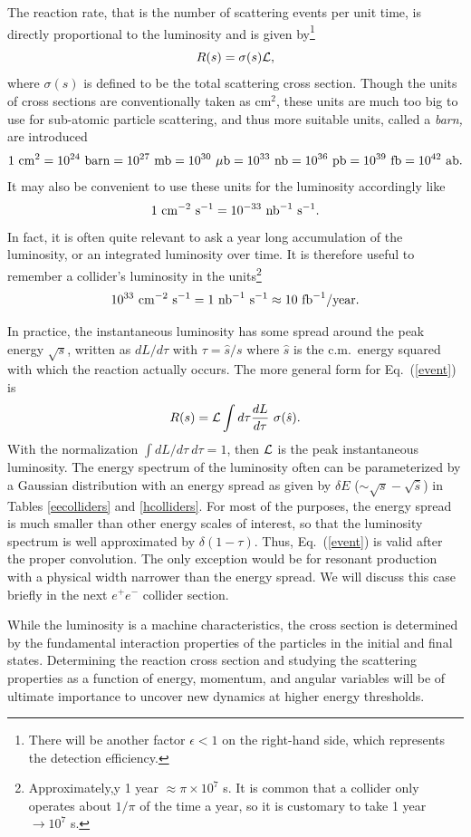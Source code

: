 \documentclass[12pt,prd,aps,floats,preprintnumbers,preprint,superscriptaddress,floatfix,nofootinbib]{revtex4}
\def\epem{e^+e^-}
\def\nbi{{\rm nb}^{-1}}
\def\fbi{{\rm fb}^{-1}}
\def\be{\begin{equation}}
\def\ee{\end{equation}}
\begin{document}
The reaction rate, that is the number of scattering events per unit time,
is  directly proportional to the luminosity and is  given by\footnote{There 
will be another factor $\epsilon<1$ on the right-hand side, 
which represents the detection efficiency.}
\be
\label{event}
R(s) = \sigma(s) \cal{L},
\ee
where $\sigma(s)$ is defined to be the total scattering cross section.
Though the units of cross sections are conventionally  taken as cm$^2$,  
these units are much too big to use for sub-atomic particle scattering, 
and thus more suitable units, called a {\it barn,} are introduced   
$$
1\ {\rm cm}^2=10^{24}\ {\rm barn}=10^{27}\ {\rm mb} = 10^{30}\ \mu{\rm b}=
10^{33}\ {\rm nb}=10^{36}\ {\rm pb}=10^{39}\ {\rm fb}=10^{42}\ {\rm ab.}
$$
It may also be convenient to use these units for the luminosity accordingly
like 
$$ 1\ {\rm cm}^{-2}\ {\rm s}^{-1} =  10^{-33}\ \nbi\ {\rm s}^{-1}.  $$ 
In fact, it is often quite relevant to ask a year long accumulation of the
luminosity, or an integrated luminosity over time. 
It is therefore useful to remember a collider's luminosity
in the units\footnote{Approximately,y
1 year $\approx \pi\times 10^7$ s. It is common that a collider only
operates about $1/\pi$ of the time a year, so it is customary 
to take 1 year $\to 10^7$ s.}
$$10^{33}\ {\rm cm}^{-2}\ {\rm s}^{-1}=1\  \nbi\ {\rm s}^{-1}\approx10\ 
\fbi/{\rm year.}$$

In practice, the instantaneous  luminosity  has some spread around the 
peak energy $\sqrt s$, written as $dL/d\tau$ with $\tau=\hat s/s$ where
$\hat s$ is the c.m.~energy squared with which the reaction actually occurs. 
The more general form for Eq.~(\ref{event}) is
\be
\label{events}
R(s) =  {\cal L} \int d\tau {dL\over d\tau}\ \sigma(\hat s).
\label{lum}
\ee
 With the normalization $\int dL/d\tau\ d\tau=1$, then ${\cal L}$ is the
 peak instantaneous luminosity. The energy spectrum of the luminosity often
can be parameterized by a Gaussian distribution with an energy spread
as given by $\delta E$ ($\sim \sqrt s- \sqrt{\hat s}$) in Tables \ref{eecolliders} and \ref{hcolliders}.
For most of the purposes, the energy spread is much smaller than other energy
scales of interest, so that the luminosity spectrum is well approximated
by  $\delta(1-\tau)$. Thus, Eq.~(\ref{event}) is valid after the proper 
convolution. The only exception would be for  resonant production with a physical
width narrower than the energy spread.  
We will discuss this case briefly  in the next $\epem$ collider section. 

While the luminosity is a machine characteristics, 
the cross section is determined by the fundamental interaction 
properties of the particles in the initial and final states.  Determining the
reaction cross section and studying the scattering properties as a function
of energy, momentum, and angular variables will be of ultimate importance
to uncover new dynamics at higher energy thresholds.
\end{document}
